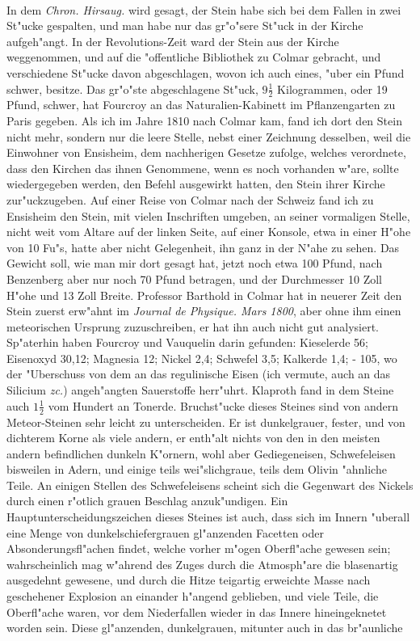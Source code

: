\documentclass[a4paper, 11pt, oneside, polutonikogreek, german]{article}
\begin{document}
\paragraph{}
In dem \emph{Chron. Hirsaug.} wird gesagt, der Stein habe sich bei dem Fallen in zwei St"ucke gespalten, und man habe nur das gr"o"sere St"uck in der Kirche aufgeh"angt. In der Revolutions-Zeit ward der Stein aus der Kirche weggenommen, und auf die "offentliche Bibliothek zu Colmar gebracht, und verschiedene St"ucke davon abgeschlagen, wovon ich auch eines, "uber ein Pfund schwer, besitze. Das gr"o"ste abgeschlagene St"uck, $\mathfrak{9\frac{1}{2}}$ Kilogrammen, oder 19 Pfund, schwer, hat Fourcroy an das Naturalien-Kabinett im Pflanzengarten zu Paris gegeben. Als ich im Jahre 1810 nach Colmar kam, fand ich dort den Stein nicht mehr, sondern nur die leere Stelle, nebst einer Zeichnung desselben, weil die Einwohner von Ensisheim, dem nachherigen Gesetze zufolge, welches verordnete, dass den Kirchen das ihnen Genommene, wenn es noch vorhanden w"are, sollte wiedergegeben werden, den Befehl ausgewirkt hatten, den Stein ihrer Kirche zur"uckzugeben. Auf einer Reise von Colmar nach der Schweiz fand ich zu Ensisheim den Stein, mit vielen Inschriften umgeben, an seiner vormaligen Stelle, nicht weit vom Altare auf der linken Seite, auf einer Konsole, etwa in einer H"ohe von 10 Fu"s, hatte aber nicht Gelegenheit, ihn ganz in der N"ahe zu sehen. Das Gewicht soll, wie man mir dort gesagt hat, jetzt noch etwa 100 Pfund, nach Benzenberg aber nur noch 70 Pfund betragen, und der Durchmesser 10 Zoll H"ohe und 13 Zoll Breite. Professor Barthold in Colmar hat in neuerer Zeit den Stein zuerst erw"ahnt im \emph{Journal de Physique. Mars 1800}, aber ohne ihm einen meteorischen Ursprung zuzuschreiben, er hat ihn auch nicht gut analysiert. Sp"aterhin haben Fourcroy und Vauquelin darin gefunden: Kieselerde 56; Eisenoxyd 30,12; Magnesia 12; Nickel 2,4; Schwefel 3,5; Kalkerde 1,4; - 105, wo der "Uberschuss von dem an das regulinische Eisen (ich vermute, auch an das Silicium \emph{zc.}) angeh"angten Sauerstoffe herr"uhrt. Klaproth fand in dem Steine auch $\mathfrak{1\frac{1}{2}}$ vom Hundert an Tonerde. Bruchst"ucke dieses Steines sind von andern Meteor-Steinen sehr leicht zu unterscheiden. Er ist dunkelgrauer, fester, und von dichterem Korne als viele andern, er enth"alt nichts von den in den meisten andern befindlichen dunkeln K"ornern, wohl aber Gediegeneisen, Schwefeleisen bisweilen in Adern, und einige teils wei"slichgraue, teils dem Olivin "ahnliche Teile. An einigen Stellen des Schwefeleisens scheint sich die Gegenwart des Nickels durch einen r"otlich grauen Beschlag anzuk"undigen. Ein Hauptunterscheidungszeichen dieses Steines ist auch, dass sich im Innern "uberall eine Menge von dunkelschiefergrauen gl"anzenden Facetten oder Absonderungsfl"achen findet, welche vorher m"ogen Oberfl"ache gewesen sein; wahrscheinlich mag w"ahrend des Zuges durch die Atmosph"are die blasenartig ausgedehnt gewesene, und durch die Hitze teigartig erweichte Masse nach geschehener Explosion an einander h"angend geblieben, und viele Teile, die Oberfl"ache waren, vor dem Niederfallen wieder in das Innere hineingeknetet worden sein. Diese gl"anzenden, dunkelgrauen, mitunter auch in das br"aunliche 
\end{document}
